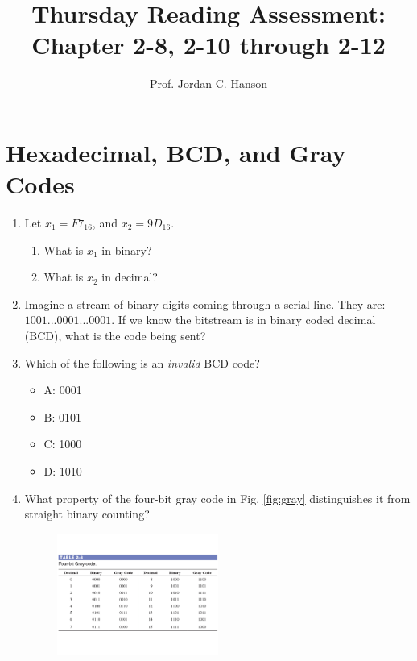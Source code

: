 \documentclass{article}
\begin{document}
\title{Thursday Reading Assessment: Chapter 2-8, 2-10 through 2-12}
\author{Prof. Jordan C. Hanson}

\maketitle

\section{Hexadecimal, BCD, and Gray Codes}

\begin{enumerate}
\item Let $x_1 = F7_{16}$, and $x_2 = 9D_{16}$.
\begin{enumerate}
\item What is $x_1$ in binary? \\ \vspace{0.5cm}
\item What is $x_2$ in decimal? \\ \vspace{0.5cm}
\end{enumerate}
\item Imagine a stream of binary digits coming through a serial line.  They are: $1001 ... 0001 ... 0001$.  If we know the bitstream is in binary coded decimal (BCD), what is the code being sent? \\ \vspace{0.5cm}
\item Which of the following is an \textit{invalid} BCD code?
\begin{itemize}
\item A: 0001
\item B: 0101
\item C: 1000
\item D: 1010
\end{itemize}
\item What property of the four-bit gray code in Fig. \ref{fig:gray} distinguishes it from straight binary counting?
\begin{figure}[hb]
\centering
\includegraphics[width=0.5\textwidth,trim=0cm 3cm 0cm 0cm,clip=true]{figures/gray.pdf}

\end{figure}
\end{enumerate}
\end{document}
